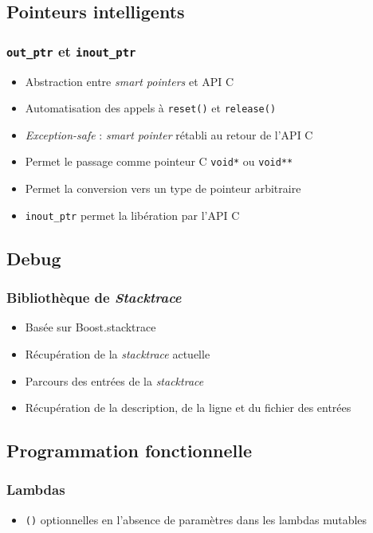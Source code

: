 \documentclass[C++.tex]{subfiles}
\begin{document}
\subsection*{Pointeurs intelligents}
\begin{frame}[fragile]
	\frametitle{\lstinline|out_ptr| et \lstinline|inout_ptr|}
	\begin{itemize}
		\item Abstraction entre \textit{smart pointers} et API C
		\item Automatisation des appels à \lstinline|reset()| et \lstinline|release()|
		\item \textit{Exception-safe} : \textit{smart pointer} rétabli au retour de l'API C


		\item Permet le passage comme pointeur C \lstinline|void*| ou \lstinline|void**|
		\item Permet la conversion vers un type de pointeur arbitraire
		\item \lstinline|inout_ptr| permet la libération par l'API C
	\end{itemize}
\end{frame}

\subsection*{Debug}
\begin{frame}[fragile]
	\frametitle{Bibliothèque de \textit{Stacktrace}}
	\begin{itemize}
		\item Basée sur Boost.stacktrace
		\item Récupération de la \textit{stacktrace} actuelle
		\item Parcours des entrées de la \textit{stacktrace}
		\item Récupération de la description, de la ligne et du fichier des entrées
	\end{itemize}
\end{frame}

\subsection*{Programmation fonctionnelle}
\begin{frame}[fragile]
	\frametitle{Lambdas}
		\begin{itemize}
			\item \lstinline|()| optionnelles en l'absence de paramètres dans les lambdas mutables


		\end{itemize}
\end{frame}
\end{document}

